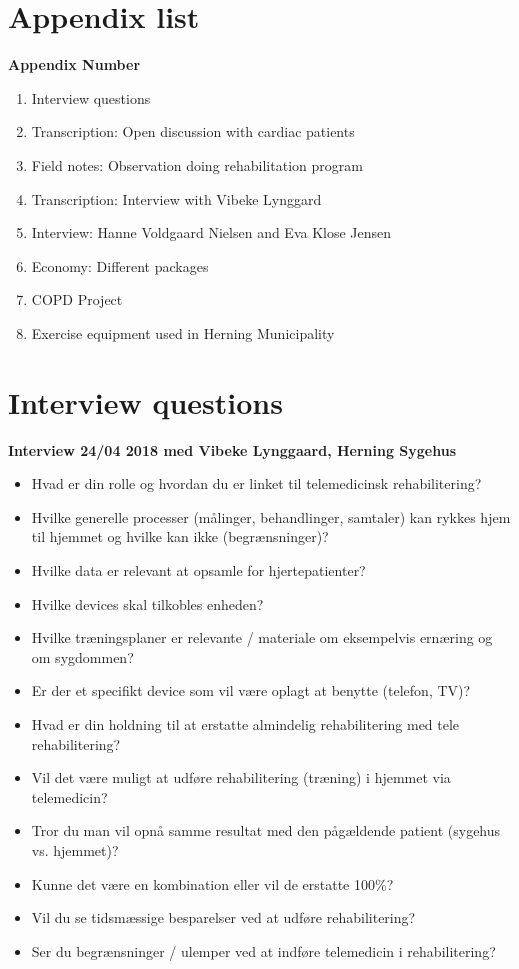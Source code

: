 \chapter{Appendix list}

\textbf{Appendix Number}
\begin{enumerate}
	\item Interview questions
	\item Transcription: Open discussion with cardiac patients
	\item Field notes: Observation doing rehabilitation program
	\item Transcription: Interview with Vibeke Lynggard
	\item Interview: Hanne Voldgaard Nielsen and Eva Klose Jensen
	\item Economy: Different packages
	\item COPD Project
	\item Exercise equipment used in Herning Municipality
\end{enumerate}



\chapter{Interview questions} \label{interviewquestion}

\textbf{Interview 24/04 2018 med Vibeke Lynggaard, Herning Sygehus} 
\begin{itemize}
	\item Hvad er din rolle og hvordan du er linket til telemedicinsk rehabilitering?
	\item Hvilke generelle processer (målinger, behandlinger, samtaler) kan rykkes hjem til hjemmet og hvilke kan ikke (begrænsninger)?
	\item Hvilke data er relevant at opsamle for hjertepatienter?
	\item Hvilke devices skal tilkobles enheden?
	\item Hvilke træningsplaner er relevante / materiale om eksempelvis ernæring og om sygdommen? 
	\item Er der et specifikt device som vil være oplagt at benytte (telefon, TV)? 
	\item Hvad er din holdning til at erstatte almindelig rehabilitering med tele rehabilitering? 
	\item Vil det være muligt at udføre rehabilitering (træning) i hjemmet via telemedicin?
	\item Tror du man vil opnå samme resultat med den pågældende patient (sygehus vs. hjemmet)?
	\item Kunne det være en kombination eller vil de erstatte 100\%? 
	\item Vil du se tidsmæssige besparelser ved at udføre rehabilitering?
	\item Ser du begrænsninger / ulemper ved at indføre telemedicin i rehabilitering? 
\end{itemize}


